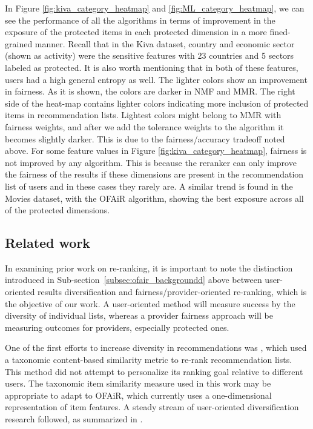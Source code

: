 In Figure \ref{fig:kiva_category_heatmap} and \ref{fig:ML_category_heatmap}, we can see the performance of all the algorithms in terms of improvement in the exposure of the protected items in each protected dimension in a more fined-grained manner. Recall that in the Kiva dataset, country and economic sector (shown as activity) were the sensitive features with 23 countries and 5 sectors labeled as protected. It is also worth mentioning that in both of these features, users had a high general entropy as well. The lighter colors show an improvement in fairness. As it is shown, the colors are darker in NMF and MMR. The right side of the heat-map contains lighter colors indicating more inclusion of protected items in recommendation lists. Lightest colors might belong to MMR with fairness weights, and after we add the tolerance weights to the algorithm it becomes slightly darker. This is due to the fairness/accuracy tradeoff noted above. For some feature values in Figure \ref{fig:kiva_category_heatmap}, fairness is not improved by any algorithm. This is because the reranker can only improve the fairness of the results if these dimensions are present in the recommendation list of users and in these cases they rarely are. A similar trend is found in the Movies dataset, with the OFAiR algorithm, showing the best exposure across all of the protected dimensions. 


\subsection{Related work}
\label{subsec:ofair_related_work}
In examining prior work on re-ranking, it is important to note the distinction introduced in Sub-section~\ref{subsec:ofair_backgroundd} above between user-oriented results diversification and fairness/provider-oriented re-ranking, which is the objective of our work. A user-oriented method will measure success by the diversity of individual lists, whereas a provider fairness approach will be measuring outcomes for providers, especially protected ones.

One of the first efforts to increase diversity in recommendations was \cite{Ziegler:2005:IRL:1060745.1060754}, which used a taxonomic content-based similarity metric to re-rank recommendation lists. This method did not attempt to personalize its ranking goal relative to different users. The taxonomic item similarity measure used in this work may be appropriate to adapt to OFAiR, which currently uses a one-dimensional representation of item features. A steady stream of user-oriented diversification research followed, as summarized in \cite{kunaver2017diversity}.

